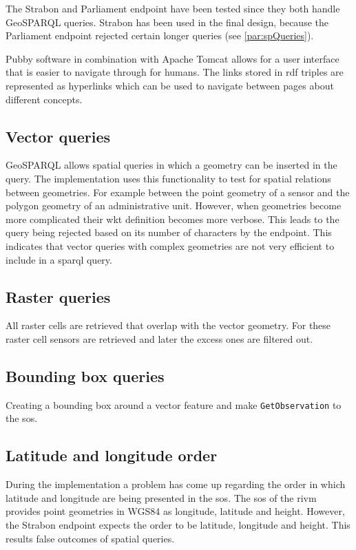 The Strabon and Parliament endpoint have been tested since they both handle GeoSPARQL queries. Strabon has been used in the final design, because the Parliament endpoint rejected certain longer queries (see \ref{par:spQueries}).

Pubby software in combination with Apache Tomcat allows for a user interface that is easier to navigate through for humans. The links stored in \ac{rdf} triples are represented as hyperlinks which can be used to navigate between pages about different concepts. 

\subsection{Vector queries}
GeoSPARQL allows spatial queries in which a geometry can be inserted in the query. The implementation uses this functionality to test for spatial relations between geometries. For example between the point geometry of a sensor and the polygon geometry of an administrative unit. However, when geometries become more complicated their \ac{wkt} definition becomes more verbose. This leads to the query being rejected based on its number of characters by the endpoint. This indicates that vector queries with complex geometries are not very efficient to include in a \ac{sparql} query.     

\subsection{Raster queries}
All raster cells are retrieved that overlap with the vector geometry. For these raster cell sensors are retrieved and later the excess ones are filtered out. 

\subsection{Bounding box queries}
Creating a bounding box around a vector feature and make \texttt{GetObservation} to the \ac{sos}.  

\subsection{Latitude and longitude order}
During the implementation a problem has come up regarding the order in which latitude and longitude are being presented in the \ac{sos}. The \ac{sos} of the \ac{rivm} provides point geometries in WGS84 as longitude, latitude and height. However, the Strabon endpoint expects the order to be latitude, longitude and height. This results false outcomes of spatial queries.    

